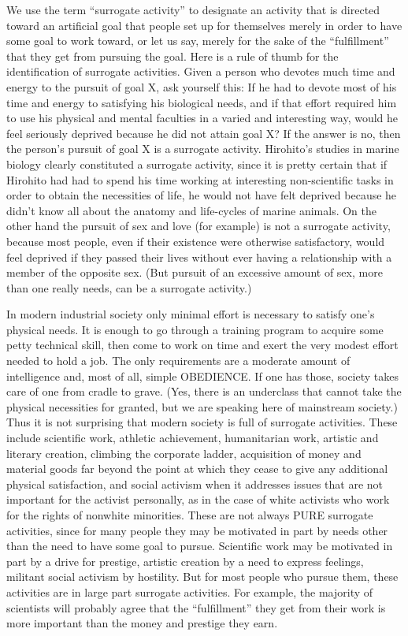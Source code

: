  We use the term “surrogate activity” to designate an activity that is directed toward an artificial goal that people set up for themselves merely in order to have some goal to work toward, or let us say, merely for the sake of the “fulfillment” that they get from pursuing the goal. Here is a rule of thumb for the identification of surrogate activities. Given a person who devotes much time and energy to the pursuit of goal X, ask yourself this: If he had to devote most of his time and energy to satisfying his biological needs, and if that effort required him to use his physical and mental faculties in a varied and interesting way, would he feel seriously deprived because he did not attain goal X? If the answer is no, then the person’s pursuit of goal X is a surrogate activity. Hirohito’s studies in marine biology clearly constituted a surrogate activity, since it is pretty certain that if Hirohito had had to spend his time working at interesting non-scientific tasks in order to obtain the necessities of life, he would not have felt deprived because he didn’t know all about the anatomy and life-cycles of marine animals. On the other hand the pursuit of sex and love (for example) is not a surrogate activity, because most people, even if their existence were otherwise satisfactory, would feel deprived if they passed their lives without ever having a relationship with a member of the opposite sex. (But pursuit of an excessive amount of sex, more than one really needs, can be a surrogate activity.)

 In modern industrial society only minimal effort is necessary to satisfy one’s physical needs. It is enough to go through a training program to acquire some petty technical skill, then come to work on time and exert the very modest effort needed to hold a job. The only requirements are a moderate amount of intelligence and, most of all, simple OBEDIENCE. If one has those, society takes care of one from cradle to grave. (Yes, there is an underclass that cannot take the physical necessities for granted, but we are speaking here of mainstream society.) Thus it is not surprising that modern society is full of surrogate activities. These include scientific work, athletic achievement, humanitarian work, artistic and literary creation, climbing the corporate ladder, acquisition of money and material goods far beyond the point at which they cease to give any additional physical satisfaction, and social activism when it addresses issues that are not important for the activist personally, as in the case of white activists who work for the rights of nonwhite minorities. These are not always PURE surrogate activities, since for many people they may be motivated in part by needs other than the need to have some goal to pursue. Scientific work may be motivated in part by a drive for prestige, artistic creation by a need to express feelings, militant social activism by hostility. But for most people who pursue them, these activities are in large part surrogate activities. For example, the majority of scientists will probably agree that the “fulfillment” they get from their work is more important than the money and prestige they earn.

